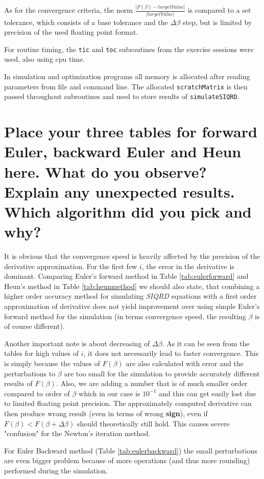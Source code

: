 \documentclass[a4paper]{article}
\begin{document}
As for the convergence criteria, the norm $ \frac{|F(\beta)-targetValue|}{|targetValue|} $ is compared to a set tolerance, which consists of a base tolerance and the $ \Delta \beta $ step, but is limited by precision of the used floating point format.

For routine timing, the \texttt{tic} and \texttt{toc} subroutines from the exercise sessions were used, also using cpu time.

In simulation and optimization programs all memory is allocated after reading parameters from file and command line. The allocated \texttt{scratchMatrix} is then passed throughout subroutines and used to store results of \texttt{simulateSIQRD}.


\section{Place your three tables for forward Euler, backward Euler and Heun here. What do you observe? Explain any unexpected results. Which algorithm did you pick and why?}
It is obvious that the convergence speed is heavily affected by the precision of the derivative approximation. For the first few $ i $, the error in the derivative is dominant. Comparing Euler's forward method in Table \ref{tab:eulerforward} and Heun's method in Table \ref{tab:heunmethod} we should also state, that combining a higher order accuracy method for simulating \textit{SIQRD} equations with a first order approximation of derivative does not yield improvement over using simple Euler's forward method for the simulation (in terms convergence speed, the resulting $ \beta $ is of course different).

Another important note is about decreasing of $ \Delta\beta $. As it can be seen from the tables for high values of $ i $, it does not necessarily lead to faster convergence. This is simply because the values of $ F(\beta) $ are also calculated with error and the perturbations to $ \beta $ are too small for the simulation to provide accurately different results of $ F(\beta) $. Also, we are adding a number that is of much smaller order compared to order of $ \beta $ which in our case is $ 10^{-1} $ and this can get easily lost due to limited floating point precision. The approximately computed derivative can then produce wrong result (even in terms of wrong \textbf{sign}), even if $ F(\beta) < F(\beta+\Delta\beta) $ should theoretically still hold. This causes severe "confusion" for the Newton's iteration method.

For Euler Backward method (Table \ref{tab:eulerbackward}) the small perturbations are even bigger problem because of more operations (and thus more rounding) performed during the simulation. 
\end{document}
